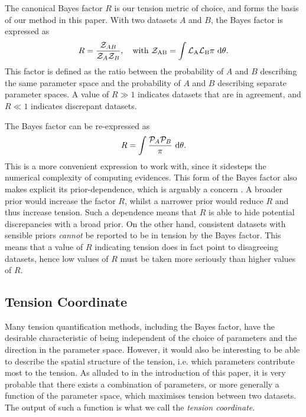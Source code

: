 \documentclass[%
 reprint,
 amsmath,amssymb,
 aps,
]{revtex4-2}
\begin{document}
The canonical Bayes factor $R$ \cite{Marshall2006} is our tension metric of choice, and forms the basis of our method in this paper. With two datasets $A$ and $B$, the Bayes factor is expressed as
\begin{equation}
    R = \frac{\mathcal{Z}_{AB}}{\mathcal{Z}_A \mathcal{Z}_B}, \quad \rm{with} \ \mathcal{Z}_{AB} = \int \mathcal{L}_A \mathcal{L}_B \pi \ \rm{d}\theta.
\end{equation}
This factor is defined as the ratio between the probability of $A$ and $B$ describing the same parameter space and the probability of $A$ and $B$ describing separate parameter spaces. A value of $R \gg 1$ indicates datasets that are in agreement, and $R \ll 1$ indicates discrepant datasets.

The Bayes factor can be re-expressed as 
\begin{equation}
    R = \int \frac{\mathcal{P}_A \mathcal{P}_B}{\pi} \ \rm{d}\theta.
\end{equation}
This is a more convenient expression to work with, since it sidesteps the numerical complexity of computing evidences. This form of the Bayes factor also makes explicit its prior-dependence, which is arguably a concern \cite{Handley2019}. A broader prior would increase the factor $R$, whilst a narrower prior would reduce $R$ and thus increase tension. Such a dependence means that $R$ is able to hide potential discrepancies with a broad prior. On the other hand, consistent datasets with sensible priors \textit{cannot} be reported to be in tension by the Bayes factor. This means that a value of $R$ indicating tension does in fact point to disagreeing datasets, hence low values of $R$ must be taken more seriously than higher values of $R$.


\subsection{Tension Coordinate}

Many tension quantification methods, including the Bayes factor, have the desirable characteristic of being independent of the choice of parameters and the direction in the parameter space. However, it would also be interesting to be able to describe the spatial structure of the tension, i.e. which parameters contribute most to the tension. As alluded to in the introduction of this paper, it is very probable that there exists a combination of parameters, or more generally a function of the parameter space, which maximises tension between two datasets. The output of such a function is what we call the \textit{tension coordinate}. 
\end{document}
